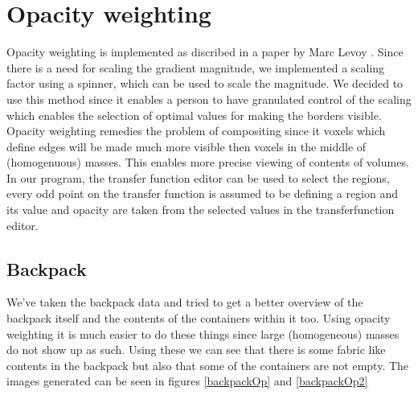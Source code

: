 \documentclass[a4paper,twoside,11pt]{article}
\begin{document}
 \newpage
 \section{Opacity weighting}
 Opacity weighting is implemented as discribed in a paper by Marc Levoy \cite{levoy_m}. Since there is a need for scaling the gradient magnitude, we implemented a scaling factor using a spinner, which can be used to scale the magnitude. We decided to use this method since it enables a person to have granulated control of the scaling which enables the selection of optimal values for making the borders visible. Opacity weighting remedies the problem of compositing since it voxels which define edges will be made much more visible then voxels in the middle of (homogenuous) masses. This enables more precise viewing of contents of volumes. \\
 
In our program, the transfer function editor can be used to select the regions, every odd point on the transfer function is assumed to be defining a region and its value and opacity are taken from the selected values in the transferfunction editor.
 
 \subsection{Backpack}

  We've taken the backpack data and tried to get a better overview of the backpack itself and the contents of the containers within it too. Using opacity weighting it is much easier to do these things since large (homogeneous) masses do not show up as such. Using these we can see that there is some fabric like contents in the backpack but also that some of the containers are not empty. The images generated can be seen in figures \ref{backpackOp} and \ref{backpackOp2}\\
 
\end{document}
